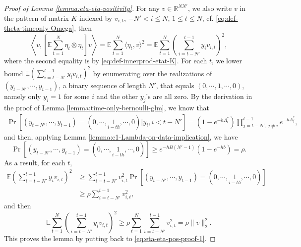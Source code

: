 \documentclass[11pt]{article}
\newcommand{\tn}[1]{\textcolor{purple}{\textsf{TG: #1}}}
\theoremstyle{remark}
\theoremstyle{plain}
\newcommand{\E}{\mathbb{E}}
\newcommand{\R}{\mathbb{R}}
\begin{document}
%
\begin{proof}[Proof of Lemma \ref{lemma:eta-eta-positivity}]
For any $v \in \R^{N N'}$, we also write $v$ in the pattern of matrix $K$ indexed by $v_{i,t}$, 
$ -N' < i \le N$, $1 \le t \le N$, cf. \eqref{eq:def-theta-timeonly-Omega}, then
\begin{equation}\label{eq:eta-eta-pos-proof-1}
\left\langle v,  \left[ \E  \sum_{t= 1}^N \eta_t \otimes \eta_t  \right] v \right\rangle
= \E \sum_{t=1}^N \langle \eta_t, v\rangle^2
= \E \sum_{t=1}^N \left(  \sum_{ i = t- N' }^{t-1}  y_i  v_{i, t} \right)^2,
\end{equation}
where the second equality is by  \eqref{eq:def-innerprod-etat-K}.
For each $t$, we lower bound $\E \left(  \sum_{ i = t- N' }^{t-1}  y_i  v_{i, t} \right)^2$ by enumerating over the realizations of
$(y_{t-N'}, \cdots, y_{t-1} )$, a binary sequence of length $N'$, that equals 
$(0, \cdots, 1, \cdots, 0)$, namely only $y_i = 1$ for some $i$ and the other $y_j$'s are all zero.
By the derivation in the proof of Lemma \ref{lemma:time-only-bernoulli-glm}, we know that
\begin{align*}
 \Pr[ (y_{t-N'}, \cdots, y_{t-1} ) = (0, \cdots, \underset{i-th}{1}, \cdots, 0) | y_{i}, i< t-N']
=   ( 1 - e^{ - h  \Lambda_i^*} ) 
   \prod_{j=t-N', \, j \neq i}^{t-1} e^{- h  \Lambda_j^* },
\end{align*}
and then, applying Lemma \ref{lemma:c1-Lambda-on-data-implication}, we have
\begin{equation}\label{eq:Pr-ysubseq-lower-bound-proof1}
 \Pr[ (y_{t-N'}, \cdots, y_{t-1} ) = (0, \cdots, \underset{i-th}{1}, \cdots, 0)] 
 \ge e^{-hB(N'-1)} (1- e^{-hb}) = \rho.
\end{equation}
As a result, for each $t$,
\begin{align*}
\E \left(  \sum_{ i = t- N' }^{t-1}  y_i  v_{i, t} \right)^2
& \ge \sum_{i = t-N'}^{t-1} v_{i,t}^2 \Pr[  (y_{t-N'}, \cdots, y_{t-1} ) = (0, \cdots, \underset{i-th}{1}, \cdots, 0) ] \\
& \ge \rho \sum_{i = t-N'}^{t-1} v_{i,t}^2,
\end{align*}
and then 
\[
 \E \sum_{t=1}^N \left(  \sum_{ i = t- N' }^{t-1}  y_i  v_{i, t} \right)^2 
 \ge   \rho \sum_{t=1}^N  \sum_{i = t-N'}^{t-1} v_{i,t}^2 
 = \rho  \|v\|_2^2.
 \]
 This proves the lemma by putting back to \eqref{eq:eta-eta-pos-proof-1}.
\end{proof}
\end{document}
